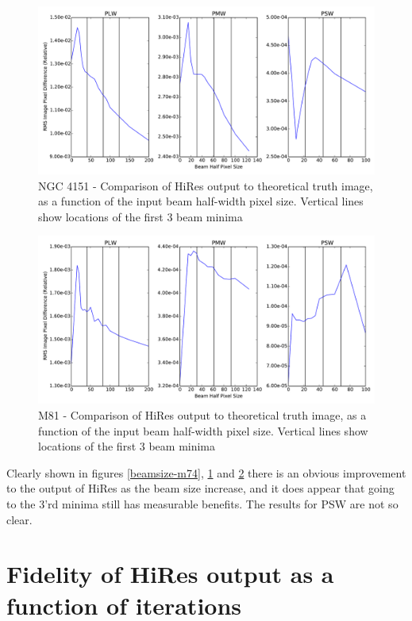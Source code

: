 \documentclass[a4paper]{article}
\numberwithin{equation}{section}
\begin{document}
\begin{figure}[H]
    \centering
    \includegraphics[width=0.85\linewidth]{beam-size-1342188588.pdf}
    \caption{NGC 4151 - Comparison of HiRes output to theoretical truth image, as a function of the input beam half-width pixel size. Vertical lines show locations of the first 3 beam minima}
    \label{beamsize-ngc4151}
\end{figure}

\begin{figure}[H]
    \centering
    \includegraphics[width=0.85\linewidth]{beam-size-1342185538.pdf}
    \caption{M81 - Comparison of HiRes output to theoretical truth image, as a function of the input beam half-width pixel size. Vertical lines show locations of the first 3 beam minima}
    \label{beamsize-m81}
\end{figure}

Clearly shown in figures \ref{beamsize-m74}, \ref{beamsize-ngc4151} and \ref{beamsize-m81} there is an obvious improvement to the output of HiRes as the beam size increase, and it does appear that going to the 3'rd minima still has measurable benefits. The results for PSW are not so clear.

\section{Fidelity of HiRes output as a function of iterations}
\end{document}
